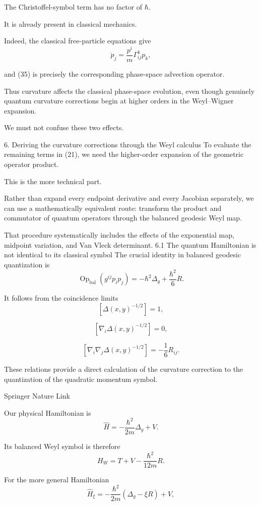 The Christoffel-symbol term has no factor of \(\hbar\).

It is already present in classical mechanics.

Indeed, the classical free-particle equations give
\[
\dot p_j
=
\frac{p^i}{m}\Gamma^k_{ij}p_k,
\tag{36}
\]

and (35) is precisely the corresponding phase-space advection operator.

Thus curvature affects the classical phase-space evolution, even though genuinely quantum curvature corrections begin at higher orders in the Weyl–Wigner expansion.

We must not confuse these two effects.

6. Deriving the curvature corrections through the Weyl calculus
To evaluate the remaining terms in (21), we need the higher-order expansion of the geometric operator product.

This is the more technical part.

Rather than expand every endpoint derivative and every Jacobian separately, we can use a mathematically equivalent route: transform the product and commutator of quantum operators through the balanced geodesic Weyl map.

That procedure systematically includes the effects of the exponential map, midpoint variation, and Van Vleck determinant.
6.1 The quantum Hamiltonian is not identical to its classical symbol
The crucial identity in balanced geodesic quantization is
\[
\boxed{
\operatorname{Op}_{\mathrm{bal}}
(g^{ij}p_ip_j)
=
-\hbar^2\Delta_g+\frac{\hbar^2}{6}R.
}
\tag{37}
\]

It follows from the coincidence limits
\[
[\Delta(x,y)^{-1/2}]=1,
\]

\[
[\nabla_i\Delta(x,y)^{-1/2}]=0,
\]

\[
\boxed{
[\nabla_i\nabla_j\Delta(x,y)^{-1/2}]
=-\frac16R_{ij}.
}
\tag{38}
\]

These relations provide a direct calculation of the curvature correction to the quantization of the quadratic momentum symbol. 

Springer Nature Link




Our physical Hamiltonian is
\[
\widehat H=
-\frac{\hbar^2}{2m}\Delta_g+V.
\tag{39}
\]

Its balanced Weyl symbol is therefore
\[
\boxed{
H_W=T+V-\frac{\hbar^2}{12m}R.
}
\tag{40}
\]

For the more general Hamiltonian
\[
\widehat H_\xi=
-\frac{\hbar^2}{2m}(\Delta_g-\xi R)+V,
\tag{41}
\]

